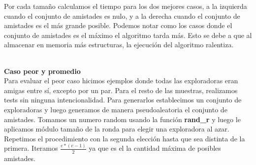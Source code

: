 \documentclass[11pt]{article}
\begin{document}
Por cada tamaño calculamos el tiempo para los dos mejores casos, a la izquierda cuando el conjunto de amistades es 
nulo, y a la derecha cuando el conjunto de amistades es el más grande posible.
Podemos notar como los casos donde el conjunto de amistades es el máximo el algoritmo tarda más. Esto se debe a que 
al almacenar en memoria más estructuras, la ejecución del algoritmo ralentiza.

\\

\textbf{Caso peor y promedio} \\

Para evaluar el peor caso hicimos ejemplos donde todas las exploradoras eran amigas entre sí, excepto por un par. 
Para el resto de las muestras, realizamos tests sin ninguna intencionalidad. Para generarlos establecimos un conjunto de 
exploradoras y luego generamos de manera pseudoaleatoria el conjunto de amistades. Tomamos un numero random 
usando la función \textbf{rand\_r} y luego le aplicamos módulo tamaño de la ronda para elegir una exploradora al azar. 
Repetimos el procedimiento con la segunda elección hasta que sea distinta de la primera. Iteramos $\frac{e*(e-1)}{2}$
ya que es el la cantidad máxima de posibles amistades.
\end{document}
